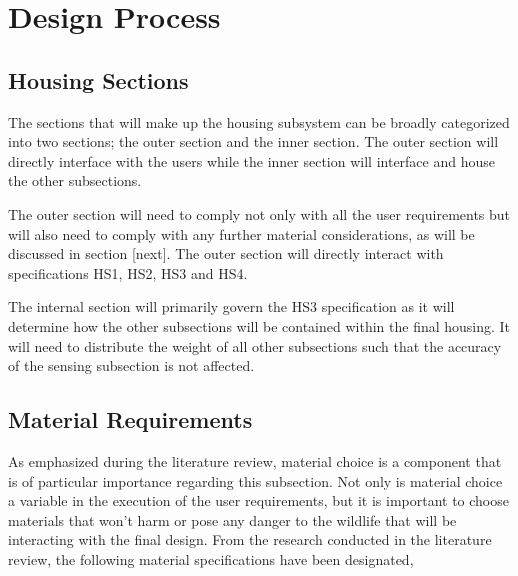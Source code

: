 \documentclass[class=report,11pt,crop=false]{standalone}
\begin{document}
\section{Design Process}
\subsection{Housing Sections}
The sections that will make up the housing subsystem can be broadly categorized into two sections; the outer section and the inner section. The outer section will directly interface with the users while the inner section will interface and house the other subsections. 

The outer section will need to comply not only with all the user requirements but will also need to comply with any further material considerations, as will be discussed in section [next]. The outer section will directly interact with specifications HS1, HS2, HS3 and HS4.

The internal section will primarily govern the HS3 specification as it will determine how the other subsections will be contained within the final housing. It will need to distribute the weight of all other subsections such that the accuracy of the sensing subsection is not affected.

\subsection{Material Requirements}
As emphasized during the literature review, material choice is a component that is of particular importance regarding this subsection. Not only is material choice a variable in the execution of the user requirements, but it is important to choose materials that won’t harm or pose any danger to the wildlife that will be interacting with the final design. From the research conducted in the literature review, the following material specifications have been designated,
\end{document}
